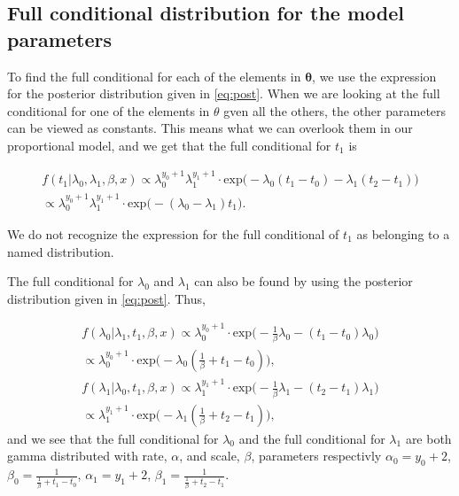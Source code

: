 \subsection{Full conditional distribution for the model parameters} \label{full_cond}

To find the full conditional for each of the elements in $\boldsymbol{\theta}$, we use the expression for the posterior distribution given in \eqref{eq:post}. When we are looking at the full conditional for one of the elements in $\theta$ gven all the others, the other parameters can be viewed as constants. This means what we can overlook them in our proportional model, and we get that the full conditional for $t_1$ is

\begin{align}
    f(t_1 | \lambda_0, \lambda_1, \beta, x) \propto 
    \lambda_0^{y_0 + 1} \lambda_1^{y_1 + 1} \cdot \text{exp} \Big( -\lambda_0(t_1 - t_0) - \lambda_1 (t_2 - t_1) \Big) \nonumber \\
    \propto  \lambda_0^{y_0 + 1} \lambda_1^{y_1 + 1} \cdot \text{exp} \Big( -(\lambda_0 - \lambda_1)t_1 \Big).
\end{align}

We do not recognize the expression for the full conditional of $t_1$ as belonging to a named distribution. 

The full conditional for $\lambda_0$ and $\lambda_1$ can also be found by using the posterior distribution given in \eqref{eq:post}. Thus, 

\begin{align}
    f(\lambda_0 | \lambda_1, t_1, \beta, x) \propto
    \lambda_0^{y_0 + 1}\cdot \text{exp} \Big( -\frac{1}{\beta} \lambda_0 - (t_1 - t_0)\lambda_0 \Big) 
    \nonumber \\
    \propto  \lambda_0^{y_0 + 1} \cdot \text{exp} \Big( - \lambda_0 (\frac{1}{\beta} + t_1 - t_0) \Big),
     \\
    f(\lambda_1 | \lambda_0, t_1, \beta, x) \propto
    \lambda_1^{y_1 + 1}\cdot \text{exp} \Big( -\frac{1}{\beta} \lambda_1 - (t_2 - t_1)\lambda_1 \Big) \nonumber \\
    \propto  \lambda_1^{y_1 + 1} \cdot \text{exp} \Big( - \lambda_1 (\frac{1}{\beta} + t_2 - t_1) \Big),
\end{align}
and we see that the full conditional for $\lambda_0$ and the full conditional for $\lambda_1$ are both gamma distributed with rate, $\alpha$, and scale, $\beta$, parameters respectivly $\alpha_0 = y_0 + 2$, $\beta_0 = \frac{1}{\frac{1}{\beta} + t_1 - t_0}$, $\alpha_1 = y_1 + 2$, $\beta_1 = \frac{1}{\frac{1}{\beta} + t_2 - t_1}$. 



